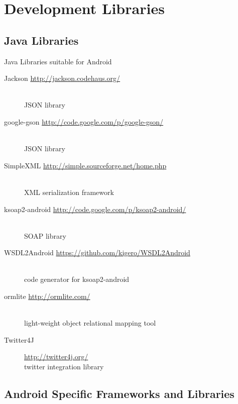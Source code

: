 \documentclass[aspectratio=169]{beamer}
\newcommand{\surl}[1] {{\tiny \url{#1}}}
\begin{document}
\section{Development Libraries}

  \subsection{Java Libraries}

    \begin{frame}{Java Libraries suitable for Android}
      \begin{description}
        \item[Jackson \surl{http://jackson.codehaus.org/}] \hfill \\ JSON library 
        \item[google-gson \surl{http://code.google.com/p/google-gson/}] \hfill \\ JSON library
        \item[SimpleXML \surl{http://simple.sourceforge.net/home.php}] \hfill \\ XML serialization framework 
        \item[ksoap2-android  \surl{http://code.google.com/p/ksoap2-android/}] \hfill \\ SOAP library 
        \item[WSDL2Android \surl{https://github.com/kigero/WSDL2Android}] \hfill \\ code generator for ksoap2-android
        \item[ormlite \surl{http://ormlite.com/}] \hfill \\ light-weight object relational mapping tool 
        \item[Twitter4J] \surl{http://twitter4j.org/} \hfill \\ twitter integration library 
      \end{description}
    \end{frame}

  \subsection{Android Specific Frameworks and Libraries}
\end{document}

